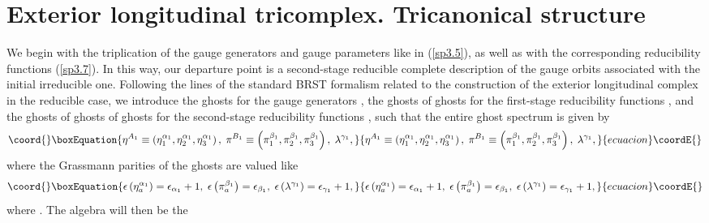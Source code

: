 \documentclass[a4paper,12pt]{article}
\begin{document}
\section{Exterior longitudinal tricomplex. Tricanonical structure}

We begin with the triplication of the gauge generators and gauge parameters
like in (\ref{sp3.5}), as well as with the corresponding reducibility
functions (\ref{sp3.7}). In this way, our departure point is a second-stage
reducible complete description of the gauge orbits associated with the
initial irreducible one. Following the lines of the standard BRST formalism
related to the construction of the exterior longitudinal complex in the
reducible case, we introduce the ghosts \coordHE{} for the gauge
generators \coordHE{}, the ghosts of ghosts \coordHE{}
for the first-stage reducibility functions \coordHE{}, and the
ghosts of ghosts of ghosts \coordHE{} for the second-stage
reducibility functions \coordHE{}, such that the entire
ghost spectrum is given by 
\begin{equation}\coord{}\boxEquation{
\eta ^{A_{1}}\equiv \left( \eta _{1}^{\alpha _{1}},\eta _{2}^{\alpha
_{1}},\eta _{3}^{\alpha _{1}}\right) ,\;\pi ^{B_{1}}\equiv \left( \pi
_{1}^{\beta _{1}},\pi _{2}^{\beta _{1}},\pi _{3}^{\beta _{1}}\right)
,\;\lambda ^{\gamma _{1}},  \label{sp3.11}
}{
\eta ^{A_{1}}\equiv \left( \eta _{1}^{\alpha _{1}},\eta _{2}^{\alpha
_{1}},\eta _{3}^{\alpha _{1}}\right) ,\;\pi ^{B_{1}}\equiv \left( \pi
_{1}^{\beta _{1}},\pi _{2}^{\beta _{1}},\pi _{3}^{\beta _{1}}\right)
,\;\lambda ^{\gamma _{1}},  }{ecuacion}\coordE{}\end{equation}
where the Grassmann parities of the ghosts are valued like 
\begin{equation}\coord{}\boxEquation{
\epsilon \left( \eta _{a}^{\alpha _{1}}\right) =\epsilon _{\alpha
_{1}}+1,\;\epsilon \left( \pi _{a}^{\beta _{1}}\right) =\epsilon _{\beta
_{1}},\;\epsilon \left( \lambda ^{\gamma _{1}}\right) =\epsilon _{\gamma
_{1}}+1,  \label{sp3.11a}
}{
\epsilon \left( \eta _{a}^{\alpha _{1}}\right) =\epsilon _{\alpha
_{1}}+1,\;\epsilon \left( \pi _{a}^{\beta _{1}}\right) =\epsilon _{\beta
_{1}},\;\epsilon \left( \lambda ^{\gamma _{1}}\right) =\epsilon _{\gamma
_{1}}+1,  }{ecuacion}\coordE{}\end{equation}
where \coordHE{}. The algebra \coordHE{} will then be the
\end{document}
